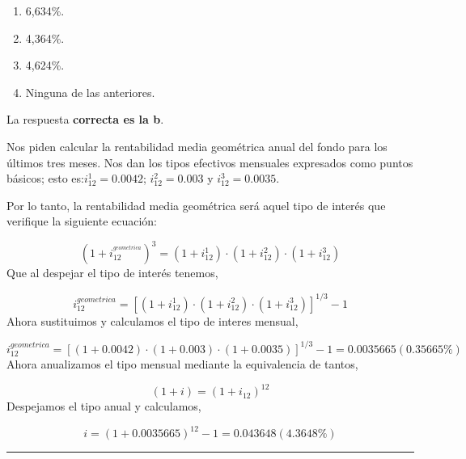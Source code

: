 \documentclass[
  letterpaper,
  DIV=11,
  numbers=noendperiod]{scrreprt}
\begin{document}
\begin{enumerate}
\def\labelenumi{\alph{enumi}.}
\item
  6,634\%.
\item
  4,364\%.
\item
  4,624\%.
\item
  Ninguna de las anteriores.
\end{enumerate}

\begin{tcolorbox}[enhanced jigsaw, left=2mm, opacityback=0, colback=white, breakable, arc=.35mm, bottomrule=.15mm, rightrule=.15mm, toprule=.15mm, leftrule=.75mm, colframe=quarto-callout-tip-color-frame]
\begin{minipage}[t]{5.5mm}
\textcolor{quarto-callout-tip-color}{\faLightbulb}
\end{minipage}%
\begin{minipage}[t]{\textwidth - 5.5mm}

La respuesta \textbf{correcta es la b}.

Nos piden calcular la rentabilidad media geométrica anual del fondo para
los últimos tres meses. Nos dan los tipos efectivos mensuales expresados
como puntos básicos; esto es:\(i_{12}^1=0.0042\); \(i_{12}^2=0.003\) y
\(i_{12}^3=0.0035\).

Por lo tanto, la rentabilidad media geométrica será aquel tipo de
interés que verifique la siguiente ecuación:

\[\left(1+i_{12}^{^{geometrica}}\right)^3=\left(1+i_{12}^1\right)\cdot\left(1+i_{12}^2\right)\cdot\left(1+i_{12}^3\right)\]
Que al despejar el tipo de interés tenemos,

\[i_{12}^{geometrica}=\left[\left(1+i_{12}^1\right)\cdot\left(1+i_{12}^2\right)\cdot\left(1+i_{12}^3\right)\right]^{1/3}-1\]
Ahora sustituimos y calculamos el tipo de interes mensual,

\[i_{12}^{geometrica}=\left[\left(1+0.0042\right)\cdot\left(1+0.003\right)\cdot\left(1+0.0035\right)\right]^{1/3}-1=0.0035665(0.35665\%)\]
Ahora anualizamos el tipo mensual mediante la equivalencia de tantos,

\[\left(1+i\right)=\left(1+i_{12}\right)^{12}\] Despejamos el tipo anual
y calculamos,

\[i=\left(1+0.0035665\right)^{12}-1=0.043648(4.3648\%)\]

\end{minipage}%
\end{tcolorbox}

\begin{center}\rule{0.5\linewidth}{0.5pt}\end{center}
\end{document}
